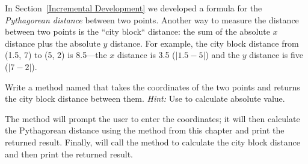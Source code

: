 \begin{exercise}
In Section~\ref{Incremental Development} we developed a formula for the {\em Pythagorean distance} between two points. Another way to measure the distance between two points is the ``city block`` distance: the sum of the absolute $x$ distance plus the absolute $y$ distance. For example, the city block distance from (1.5, 7) to (5, 2) is 8.5---the $x$ distance is 3.5 ($|1.5 - 5|$) and the $y$ distance is five ($|7 - 2|$).

Write a method named  that takes the coordinates of the two points and returns the city block distance between them. {\em Hint:} Use  to calculate absolute value.

The  method will prompt the user to enter the coordinates; it will then calculate the Pythagorean distance using the  method from this chapter and print the returned result. Finally,  will call the  method to calculate the city block distance and then print the returned result.
\end{exercise}

